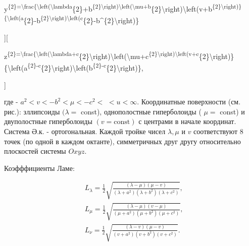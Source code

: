 \documentclass[10pt]{article}
\begin{document}
y\textsuperscript{\{2\}=\textbackslash frac\{\textbackslash left(\textbackslash lambda}\{2\}+b\textsuperscript{\{2\}\textbackslash right)\textbackslash left(\textbackslash mu+b}\{2\}\textbackslash right)\textbackslash left(v+b\textsuperscript{\{2\}\textbackslash right)\}\{\textbackslash left(a}\{2\}-b\textsuperscript{\{2\}\textbackslash right)\textbackslash left(c}\{2\}-b\^{}\{2\}\textbackslash right)\}



][



z\textsuperscript{\{2\}=\textbackslash frac\{\textbackslash left(\textbackslash lambda+c}\{2\}\textbackslash right)\textbackslash left(\textbackslash mu+c\textsuperscript{\{2\}\textbackslash right)\textbackslash left(v+c}\{2\}\textbackslash right)\}\{\textbackslash left(a\textsuperscript{\{2\}-c}\{2\}\textbackslash right)\textbackslash left(b\textsuperscript{\{2\}-c}\{2\}\textbackslash right)\},

]



где - $a^{2}<v<-b^{2}<\mu<-c^{2}<$ $<u<\infty$. Координатные поверхности (см. рис.): зллипсоиды $(\lambda=$ const), однополостные гиперболоиды ( $\mu=$ const) и двуполостные гиперболоиды $(v=\mathrm{const})$ с центрами в начале координат. Система Ә.к. - ортогональная. Каждой тройке чисел $\lambda, \mu$ и $v$ соответствуют 8 точек (по одной в каждом октанте), симметричных друг другу относительно плоскостей системы $O x y z$.



Коэфффициенты Ламе:



\[

\begin{aligned}

& L_{\lambda}=\frac{1}{2} \sqrt{\frac{(\lambda-\mu)(\mu-v)}{\left(\lambda+a^{2}\right)\left(\lambda+b^{2}\right)\left(\lambda+c^{2}\right)}}, \\

& L_{\mu}=\frac{1}{2} \sqrt{\frac{(\lambda-\mu)(v-\mu)}{\left(\mu+a^{2}\right)\left(\mu+b^{2}\right)\left(\mu+c^{2}\right)}}, \\

& L_{\nu}=\frac{1}{2} \sqrt{\frac{(\lambda-v)(\mu-v)}{\left(v+a^{2}\right)\left(v+b^{2}\right)\left(v+c^{2}\right)}} .

\end{aligned}

\]
\end{document}
